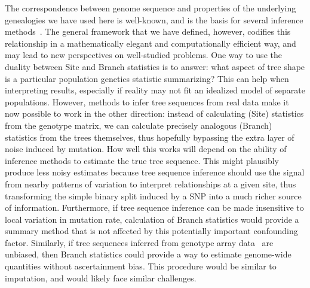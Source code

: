 \documentclass[9pt,twoside,lineno]{gsajnl}
\begin{document}
The correspondence between genome sequence and properties of the
underlying genealogies we have used here is well-known,
and is the basis for several inference methods~\citep{becquet2007new,beeravolu2018able}.
The general framework
that we have defined, however, codifies this relationship in a
mathematically elegant and computationally efficient way, and may lead to
new perspectives on well-studied problems.
One way to use the duality between Site and Branch statistics is to answer:
what aspect of tree shape is a particular population genetics statistic summarizing?
This can help when interpreting results, especially if reality may not fit an idealized model
of separate populations.
However, methods to infer tree sequences from real data
make it now possible to work in the other direction:
instead of calculating (Site) statistics from the genotype matrix,
we can calculate precisely analogous (Branch) statistics from the trees themselves,
thus hopefully bypassing the extra layer of noise induced by mutation.
How well this works will depend on the ability of inference methods
to estimate the true tree sequence.
This might plausibly produce less noisy estimates because tree sequence inference
should use the signal from nearby patterns of variation
to interpret relationships at a given site,
thus transforming the simple binary split induced by a SNP
into a much richer source of information.
Furthermore,
if tree sequence inference can be made insensitive to local variation in mutation rate,
calculation of Branch statistics would provide a summary method
that is not affected by this potentially important confounding factor.
Similarly, if tree sequences inferred from
genotype array data~\citep{kelleher2019inferring} are unbiased,
then Branch statistics could provide a way
to estimate genome-wide quantities without ascertainment bias.
This procedure would be similar to imputation, and would likely face similar challenges.

\end{document}
